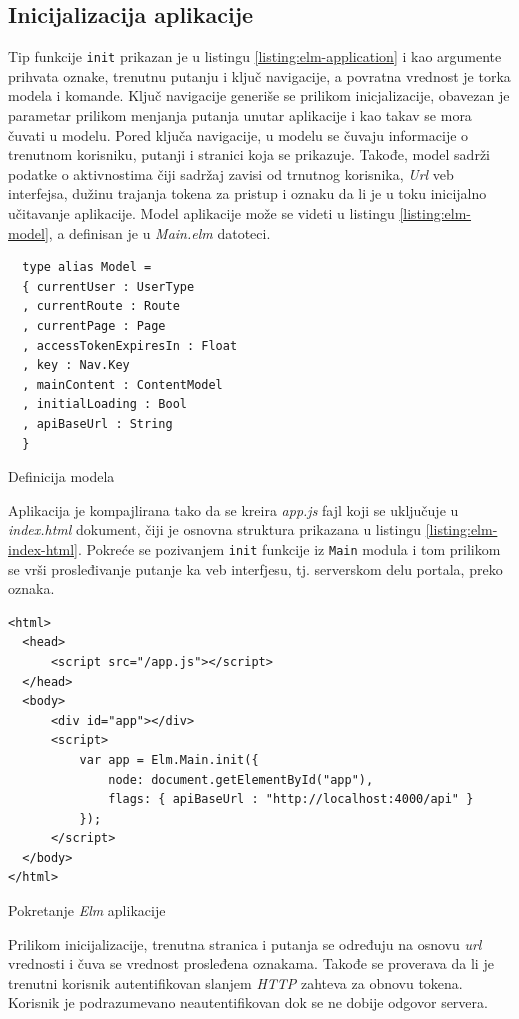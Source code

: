 \documentclass[12pt,oneside]{memoir}
\begin{document}
\subsection{Inicijalizacija aplikacije}
Tip funkcije \texttt{init} prikazan je u listingu \ref{listing:elm-application} i kao argumente prihvata oznake, trenutnu putanju i ključ navigacije,
a povratna vrednost je torka modela i komande. Ključ navigacije generiše se prilikom inicjalizacije, obavezan je parametar prilikom menjanja
putanja unutar aplikacije i kao takav se mora čuvati u modelu. Pored ključa navigacije, u modelu se čuvaju informacije o trenutnom korisniku,
putanji i stranici koja se prikazuje. Takođe, model sadrži podatke o aktivnostima čiji sadržaj zavisi od trnutnog korisnika, \emph{Url} veb interfejsa,
dužinu trajanja tokena za pristup i oznaku da li je u toku inicijalno učitavanje aplikacije. Model aplikacije može se videti u listingu \ref{listing:elm-model},
a definisan je u \emph{Main.elm} datoteci.
\begin{listing}[h]
\begin{verbatim}
  type alias Model =
  { currentUser : UserType
  , currentRoute : Route
  , currentPage : Page
  , accessTokenExpiresIn : Float
  , key : Nav.Key
  , mainContent : ContentModel
  , initialLoading : Bool
  , apiBaseUrl : String
  }
\end{verbatim}
\caption{Definicija modela}
\label{listing:elm-model}
\end{listing}

Aplikacija je kompajlirana tako da se kreira \emph{app.js} fajl koji se uključuje u \emph{index.html} dokument,
čiji je osnovna struktura prikazana u listingu \ref{listing:elm-index-html}. Pokreće se pozivanjem \texttt{init}
funkcije iz \texttt{Main} modula i tom prilikom se vrši prosleđivanje putanje ka veb interfjesu, tj. serverskom delu portala,
preko oznaka.
\begin{listing}[h]
\begin{verbatim}
<html>
  <head>
      <script src="/app.js"></script>
  </head>
  <body>
      <div id="app"></div>
      <script>
          var app = Elm.Main.init({
              node: document.getElementById("app"),
              flags: { apiBaseUrl : "http://localhost:4000/api" }
          });
      </script>
  </body>
</html>
\end{verbatim}
\caption{Pokretanje \emph{Elm} aplikacije}
\label{listing:elm-index-html}
\end{listing}
Prilikom inicijalizacije, trenutna stranica i putanja se određuju na osnovu \emph{url} vrednosti i
čuva se vrednost prosleđena oznakama. Takođe se proverava da li je trenutni korisnik autentifikovan
slanjem \emph{HTTP} zahteva za obnovu tokena. Korisnik je podrazumevano neautentifikovan dok se ne dobije
odgovor servera. 
\end{document}
